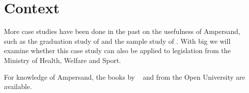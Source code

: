 \newpage
\section{Context} \label{context}
\begin{comment}
\begin{wrapfigure}{r}{.5\textwidth} 
    \includegraphics[scale=0.25]
        {Contented_Definitie_Ampersand_Wikipedia-1024x698.png}
    \caption{www.contented.nl/wat-weet-jij-van-het-en-teken-de-ampersand}
    \label{fig:Ampersand definition}
\end{wrapfigure}
The ampersand sign~\footnote{\url{https://www.contented.nl/wat-weet-je-van-het-en-teken-de-ampersand}} and the Ampersand method both emphasize the meaning "and self-contained" (see figure~\ref{fig:Ampersand definition}).
On the website of 
Ampersand~\footnote{\url{https://ampersandtarski.gitbook.io/documentation/why-ampersand/business-rules-in-ampersand}} 
we find an interpretation of the statement "standalone (op zichzelfstaand)".
\end{comment}
More case studies have been done in the past on the usefulness of Ampersand, such as the graduation study of  and the sample study of .
With \acrshort{big} we will examine whether this case study can also be applied to legislation from the Ministry of Health, Welfare and Sport.

For knowledge of Ampersand, the books by ~
and  from the Open University are available.










